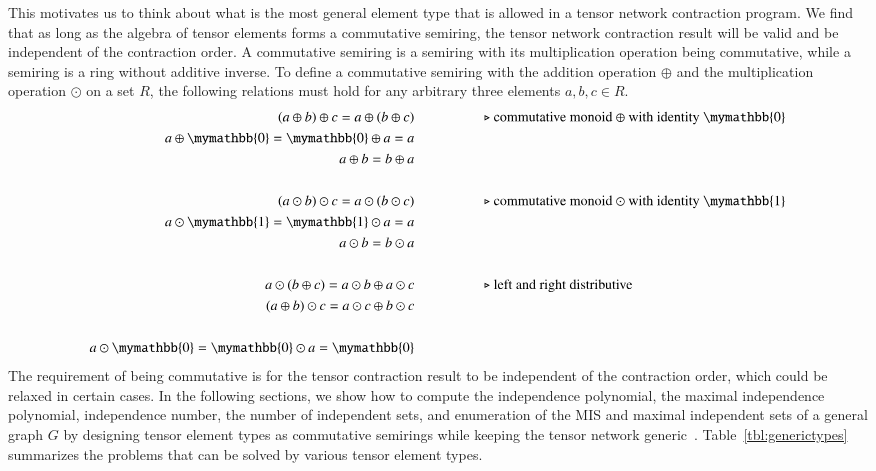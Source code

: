 \documentclass[onefignum, onetabnum]{siamart190516}
\newcommand{\<}{\langle}
\renewcommand{\>}{\rangle}
\begin{document}
This motivates us to think about what is the most general element type that is allowed in a tensor network contraction program.
We find that as long as the algebra of tensor elements forms a commutative semiring, the tensor network contraction result will be valid and be independent of the contraction order.
A commutative semiring is a semiring with its multiplication operation being commutative, while a semiring is a ring without additive inverse.
To define a commutative semiring with the addition operation $\oplus$ and the multiplication operation $\odot$ on a set $R$, the following relations must hold for any arbitrary three elements $a, b, c \in R$.
\begin{align*}
(a \oplus b) \oplus c = a \oplus (b \oplus c) & \hspace{5em}\text{$\triangleright$ commutative monoid $\oplus$ with identity $\mymathbb{0}$}\\
a \oplus \mymathbb{0} = \mymathbb{0} \oplus a = a &\\
a \oplus b = b \oplus a &\\
&\\
(a \odot b) \odot c = a \odot (b \odot c)  &   \hspace{5em}\text{$\triangleright$ commutative monoid $\odot$ with identity $\mymathbb{1}$}\\
a \odot  \mymathbb{1} =  \mymathbb{1} \odot a = a &\\
a \odot b = b \odot a &\\
&\\
a \odot (b\oplus c) = a\odot b \oplus a\odot c  &  \hspace{5em}\text{$\triangleright$ left and right distributive}\\
(a\oplus b) \odot c = a\odot c \oplus b\odot c &\\
&\\
a \odot \mymathbb{0} = \mymathbb{0} \odot a = \mymathbb{0}
\end{align*}
The requirement of being commutative is for the tensor contraction result to be independent of the contraction order, which could be relaxed in certain cases. In the following sections, we show how to compute the independence polynomial,
the maximal independence polynomial, independence number, the number of independent sets, and enumeration of the MIS and maximal independent sets of a general graph $G$ by designing tensor element types as commutative semirings while keeping the tensor network generic~\cite{Stepanov2014}.
Table~\ref{tbl:generictypes} summarizes the problems that can be solved by various tensor element types. 
\end{document}
